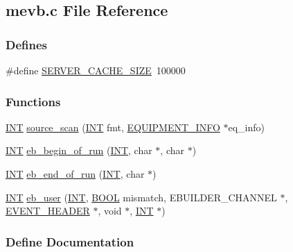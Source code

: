\subsection{mevb.c File Reference}
\label{mevb_8c}
\subsubsection*{Defines}
\begin{DoxyCompactItemize}
\item 
\#define \hyperlink{mevb_8c_a022c39e327f494dda3664f8888f860f1}{SERVER\_\-CACHE\_\-SIZE}~100000
\end{DoxyCompactItemize}
\subsubsection*{Functions}
\begin{DoxyCompactItemize}
\item 
\hyperlink{vppg_8h_a392e62da233ed3e2f7c3fd4f487a3896}{INT} \hyperlink{mevb_8c_ae77cd1e2416ccddffaec80b061b300e6}{source\_\-scan} (\hyperlink{vppg_8h_a392e62da233ed3e2f7c3fd4f487a3896}{INT} fmt, \hyperlink{structEQUIPMENT__INFO}{EQUIPMENT\_\-INFO} $\ast$eq\_\-info)
\item 
\hyperlink{vppg_8h_a392e62da233ed3e2f7c3fd4f487a3896}{INT} \hyperlink{mevb_8c_aac338f16c26978fda836e729d5c6e366}{eb\_\-begin\_\-of\_\-run} (\hyperlink{vppg_8h_a392e62da233ed3e2f7c3fd4f487a3896}{INT}, char $\ast$, char $\ast$)
\item 
\hyperlink{vppg_8h_a392e62da233ed3e2f7c3fd4f487a3896}{INT} \hyperlink{mevb_8c_a98d66006b73521032c8d02040f6cf4b8}{eb\_\-end\_\-of\_\-run} (\hyperlink{vppg_8h_a392e62da233ed3e2f7c3fd4f487a3896}{INT}, char $\ast$)
\item 
\hyperlink{vppg_8h_a392e62da233ed3e2f7c3fd4f487a3896}{INT} \hyperlink{mevb_8c_a9f20cb62a85e635ba6b858b380cf1b49}{eb\_\-user} (\hyperlink{vppg_8h_a392e62da233ed3e2f7c3fd4f487a3896}{INT}, \hyperlink{vt2_8h_a239c7f0d40651c3e419c5b9651507d14}{BOOL} mismatch, EBUILDER\_\-CHANNEL $\ast$, \hyperlink{structEVENT__HEADER}{EVENT\_\-HEADER} $\ast$, void $\ast$, \hyperlink{vppg_8h_a392e62da233ed3e2f7c3fd4f487a3896}{INT} $\ast$)
\end{DoxyCompactItemize}


\subsubsection{Define Documentation}
